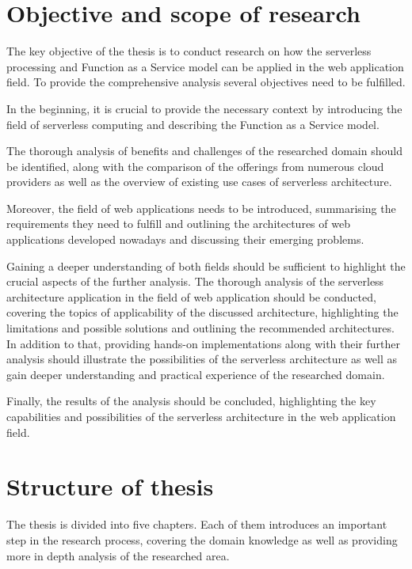 \section{Objective and scope of research}

The key objective of the thesis is to conduct research on how the serverless processing and Function as a Service model can be applied in the web application field.
To provide the comprehensive analysis several objectives need to be fulfilled.

In the beginning, it is crucial to provide the necessary context by introducing the field of serverless computing and describing the Function as a Service model.

The thorough analysis of benefits and challenges of the researched domain should be identified, along with the comparison of the offerings from numerous cloud providers as well as the overview of existing use cases of serverless architecture.

Moreover, the field of web applications needs to be introduced, summarising the requirements they need to fulfill and outlining the architectures of web applications developed nowadays and discussing their emerging problems.

Gaining a deeper understanding of both fields should be sufficient to highlight the crucial aspects of the further analysis.
The thorough analysis of the serverless architecture application in the field of web application should be conducted, covering the topics of applicability of the discussed architecture,
highlighting the limitations and possible solutions and outlining the recommended architectures.
In addition to that, providing hands-on implementations along with their further analysis should illustrate the possibilities of the serverless architecture as well as gain deeper understanding and practical experience of the researched domain.

Finally, the results of the analysis should be concluded, highlighting the key capabilities and possibilities of the serverless architecture in the web application field.

\section{Structure of thesis}

The thesis is divided into five chapters. Each of them introduces an important step in the research process, covering the domain knowledge as well as providing more in depth analysis of the researched area.

